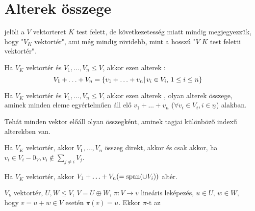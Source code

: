 \section{Alterek összege}
\begin{jel}
	 jelöli a $V$ vektorteret $K$ test felett, de következetesség miatt
	mindig megjegyezzük, hogy "$V_K$ vektortér", ami még mindig rövidebb,
	mint a hosszú "$V$ $K$ test feletti vektortér".
\end{jel}
\begin{ff}
	Ha $V_K$ vektortér és $V_1,\ldots,V_n\leq V$, akkor ezen alterek
	:
	\begin{equation*}
		V_1+\ldots+V_n=\{v_1+\ldots +v_n|\,v_i\in V_i,\,1\leq i\leq n\}
	\end{equation*}
\end{ff}
\begin{ff}
	Ha $V_K$ vektortér és $V_1,\ldots,V_n\leq V$, akkor ezen alterek
	, olyan alterek összege, aminek minden eleme
	egyértelműen áll elő $v_1+\ldots+v_n$ ($\forall v_i\in
	V_i, i\in\underline{n}$) alakban.
\end{ff}
\begin{megj}
	Tehát minden vektor előáll olyan összegként, aminek tagjai különböző
	indexű alterekben van.
\end{megj}
\begin{all}
	Ha $V_K$ vektortér, akkor $V_1,\ldots,V_n$ összeg direkt, akkor és
	csak akkor, ha $v_i\in V_i-{0_V},v_i\not\in\sum_{j\neq i}V_j$.
\end{all}
\begin{all}
	Ha $V_K$ vektortér, akkor $V_1+\ldots +V_n(=\operatorname{span}(\cup V_i))$ altér.
\end{all}
\begin{ff}
	$V_k$ vektortér, $U,W\leq V$, $V=U\oplus W$, $\pi :V\to v$ lineáris
	leképezés, $u\in U$, $w\in W$, hogy $v=u+w \in V$ esetén $\pi(v)=u$.
	Ekkor $\pi$-t az 
\end{ff}

